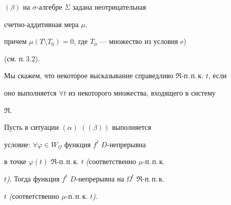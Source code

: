 $(\beta)$ на $\sigma$-алгебре $\Sigma$ задана неотрицательная


счетно-аддитивная мера $\mu$,


причем $\mu(T\setminus T_0)=0$, где $T_0$ --- множество из условия e)


(см. п.\,3.2).





Мы скажем, что некоторое высказывание справедливо $\Re$-п.\,п.\,к. $t$, если


оно выполняется $\forall t$ из некоторого множества, входящего в систему


$\Re$.





\begin{thms} Пусть в ситуации $(\alpha)$ $((\beta))$ выполняется


условие: $\forall\varphi\in W_\Omega$ функция $f^t$ \; $D$-непрерывна


в точке $\varphi(t)$ $\Re$-п.\,п.\,к. $t$ {\em (}соответственно $\mu$-п.\,п.\,к.


$t${\em )}. Тогда функция $f^t$ \; $D$-непрерывна на $\Omega^t$ $\Re$-п.\,п.\,к.


$t$ {\em (}соответственно $\mu$-п.\,п.\,к. $t${\em )}.


\end{thms}





